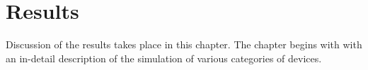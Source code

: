 \chapter{Results}
Discussion of the results takes place in this chapter. The chapter begins with
with an in-detail description of the simulation of various categories of devices.


